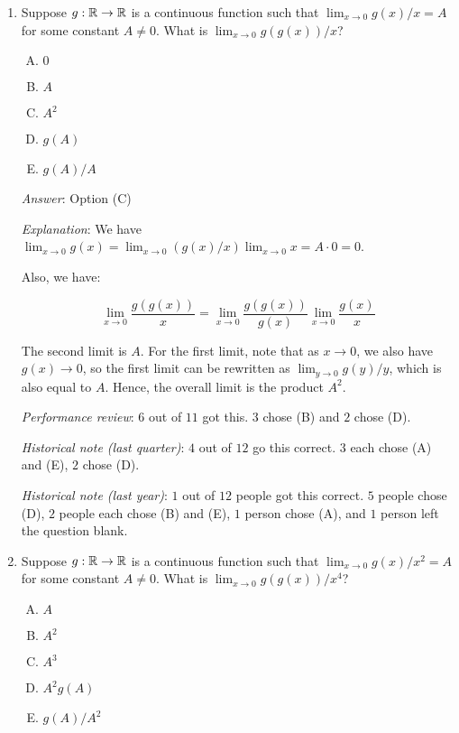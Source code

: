 \documentclass[10pt]{amsart}
\begin{document}
\begin{enumerate}

\item Suppose $g:\mathbb{R} \to \mathbb{R}$ is a continuous function such that
  $\lim_{x \to 0} g(x)/x = A$ for some constant $A \ne 0$. What is
  $\lim_{x \to 0} g(g(x))/x$? 

  \begin{enumerate}[(A)]
  \item $0$
  \item $A$
  \item $A^2$
  \item $g(A)$
  \item $g(A)/A$
  \end{enumerate}

  {\em Answer}: Option (C)

  {\em Explanation}: We have $\lim_{x \to 0} g(x) = \lim_{x \to 0}
  (g(x)/x) \lim_{x \to 0} x = A \cdot 0 = 0$.

  Also, we have:

  $$\lim_{x \to 0} \frac{g(g(x))}{x} = \lim_{x \to 0} \frac{g(g(x))}{g(x)} \lim_{x \to 0} \frac{g(x)}{x}$$

  The second limit is $A$. For the first limit, note that as $x \to
  0$, we also have $g(x) \to 0$, so the first limit can be rewritten
  as $\lim_{y \to 0} g(y)/y$, which is also equal to $A$. Hence, the
  overall limit is the product $A^2$.

  {\em Performance review}: $6$ out of $11$ got this. $3$ chose (B)
  and $2$ chose (D).

  {\em Historical note (last quarter)}: $4$ out of $12$ go this
  correct. $3$ each chose (A) and (E), $2$ chose (D).

  {\em Historical note (last year)}: $1$ out of $12$ people got this
  correct. $5$ people chose (D), $2$ people each chose (B) and (E),
  $1$ person chose (A), and $1$ person left the question blank.


\item Suppose $g:\mathbb{R} \to \mathbb{R}$ is a continuous function such that
  $\lim_{x \to 0} g(x)/x^2 = A$ for some constant $A \ne 0$. What is
  $\lim_{x \to 0} g(g(x))/x^4$? 

  \begin{enumerate}[(A)]
  \item $A$
  \item $A^2$
  \item $A^3$
  \item $A^2g(A)$
  \item $g(A)/A^2$
  \end{enumerate}


\end{enumerate}
\end{document}
